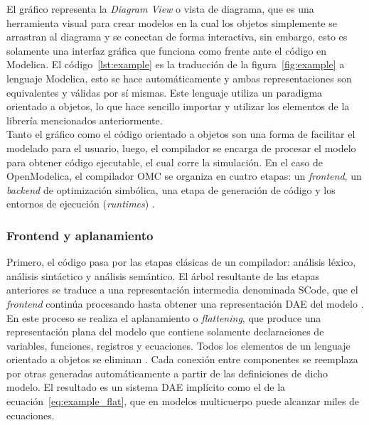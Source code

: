 El gráfico representa la \textit{Diagram View} o vista de diagrama, que es una herramienta visual para crear modelos en la cual los objetos simplemente se arrastran al diagrama y se conectan de forma interactiva, sin embargo, esto es solamente una interfaz gráfica que funciona como frente ante el código en Modelica. El código~\ref{lst:example} es la traducción de la figura~\ref{fig:example} a lenguaje Modelica, esto se hace automáticamente y ambas representaciones son equivalentes y válidas por sí mismas. Este lenguaje utiliza un paradigma orientado a objetos, lo que hace sencillo importar y utilizar los elementos de la librería mencionados anteriormente. \\

Tanto el gráfico como el código orientado a objetos son una forma de facilitar el modelado para el usuario, luego, el compilador se encarga de procesar el modelo para obtener código ejecutable, el cual corre la simulación. En el caso de OpenModelica, el compilador OMC se organiza en cuatro etapas: un \textit{frontend}, un \textit{backend} de optimización simbólica, una etapa de generación de código y los entornos de ejecución (\textit{runtimes}) \cite{om_compiler}. \\

\subsubsection{Frontend y aplanamiento} 




Primero, el código pasa por las etapas clásicas de un compilador: análisis léxico, análisis sintáctico y análisis semántico. El árbol resultante de las etapas anteriores se traduce a una representación intermedia denominada SCode, que el \textit{frontend} continúa procesando hasta obtener una representación DAE del modelo \cite{om_compiler}. En este proceso se realiza el aplanamiento o \textit{flattening}, que produce una representación plana del modelo que contiene solamente declaraciones de variables, funciones, registros y ecuaciones. Todos los elementos de un lenguaje orientado a objetos se eliminan \cite{om_flattening}. Cada conexión entre componentes se reemplaza por otras generadas automáticamente a partir de las definiciones de dicho modelo. El resultado es un sistema DAE implícito como el de la ecuación~\eqref{eq:example_flat}, que en modelos multicuerpo puede alcanzar miles de ecuaciones.

